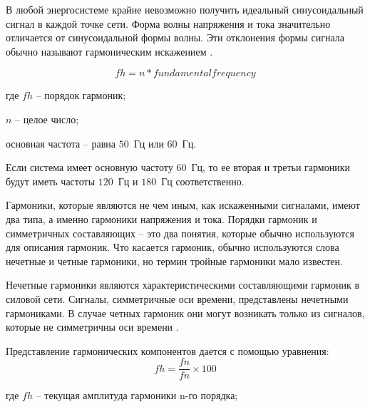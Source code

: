 В любой энергосистеме крайне невозможно получить идеальный синусоидальный сигнал в каждой точке сети. Форма волны напряжения и тока значительно отличается от синусоидальной формы волны. Эти отклонения формы сигнала обычно называют гармоническим искажением \cite{durdhavale2016review}.

\begin{equation}
	\label{eq:equation1.11}
	fh = n * fundamental frequency
\end{equation} 

где $fh$ – порядок гармоник;

$n$ – целое число;

основная частота – равна $50$~Гц или $60$~Гц.

Если система имеет основную частоту $60$~Гц, то ее вторая и третьи гармоники будут иметь частоты $120$~Гц и $180$~Гц соответственно.


Гармоники, которые являются не чем иным, как искаженными сигналами, имеют два типа, а именно гармоники напряжения и тока. Порядки гармоник и симметричных составляющих – это два понятия, которые обычно используются для описания гармоник. Что касается гармоник, обычно используются слова нечетные и четные гармоники, но термин тройные гармоники мало известен.

Нечетные гармоники являются характеристическими составляющими гармоник в силовой сети. Сигналы, симметричные оси времени, представлены нечетными гармониками. В случае четных гармоник они могут возникать только из сигналов, которые не симметричны оси времени \cite{soni2014review}.
 
Представление гармонических компонентов дается с помощью уравнения:  
\begin{equation}
	\label{eq:equation1.12}
	fh = \frac{fn}{fn}\times 100
\end{equation} 

где $fh$ – текущая амплитуда гармоники n-го порядка;

